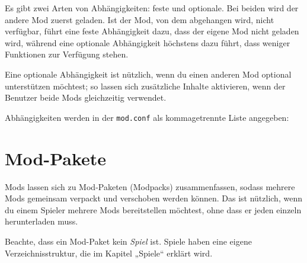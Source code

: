Es gibt zwei Arten von Abhängigkeiten: feste und optionale. Bei beiden
wird der andere Mod zuerst geladen. Ist der Mod, von dem abgehangen
wird, nicht verfügbar, führt eine feste Abhängigkeit dazu, dass der
eigene Mod nicht geladen wird, während eine optionale Abhängigkeit
höchstens dazu führt, dass weniger Funktionen zur Verfügung stehen.

Eine optionale Abhängigkeit ist nützlich, wenn du einen anderen Mod
optional unterstützen möchtest; so lassen sich zusätzliche Inhalte
aktivieren, wenn der Benutzer beide Mods gleichzeitig verwendet.

Abhängigkeiten werden in der \texttt{mod.\allowbreak{}conf} als
kommagetrennte Liste angegeben:

\begin{Shaded}
\begin{Highlighting}[]
\end{Highlighting}
\end{Shaded}

\section{Mod-Pakete}\label{mod-pakete}

Mods lassen sich zu Mod-Paketen (Modpacks)
zusammenfassen, sodass mehrere Mods gemeinsam verpackt und verschoben
werden können. Das ist nützlich, wenn du einem Spieler mehrere Mods
bereitstellen möchtest, ohne dass er jeden einzeln herunterladen muss.

\begin{Shaded}
\begin{Highlighting}[]
\end{Highlighting}
\end{Shaded}

Beachte, dass ein Mod-Paket kein \emph{Spiel} ist. Spiele haben eine
eigene Verzeichnisstruktur, die im Kapitel „Spiele`` erklärt wird.
